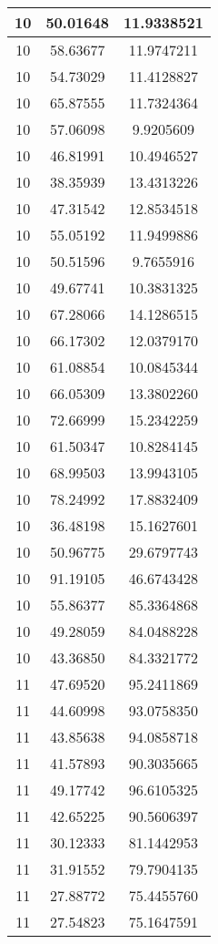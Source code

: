 \documentclass[
]{book}
\begin{document}
\begin{tabular}{c|c|c}
\hline
10 & 50.01648 & 11.9338521\\
\hline
10 & 58.63677 & 11.9747211\\
\hline
10 & 54.73029 & 11.4128827\\
\hline
10 & 65.87555 & 11.7324364\\
\hline
10 & 57.06098 & 9.9205609\\
\hline
10 & 46.81991 & 10.4946527\\
\hline
10 & 38.35939 & 13.4313226\\
\hline
10 & 47.31542 & 12.8534518\\
\hline
10 & 55.05192 & 11.9499886\\
\hline
10 & 50.51596 & 9.7655916\\
\hline
10 & 49.67741 & 10.3831325\\
\hline
10 & 67.28066 & 14.1286515\\
\hline
10 & 66.17302 & 12.0379170\\
\hline
10 & 61.08854 & 10.0845344\\
\hline
10 & 66.05309 & 13.3802260\\
\hline
10 & 72.66999 & 15.2342259\\
\hline
10 & 61.50347 & 10.8284145\\
\hline
10 & 68.99503 & 13.9943105\\
\hline
10 & 78.24992 & 17.8832409\\
\hline
10 & 36.48198 & 15.1627601\\
\hline
10 & 50.96775 & 29.6797743\\
\hline
10 & 91.19105 & 46.6743428\\
\hline
10 & 55.86377 & 85.3364868\\
\hline
10 & 49.28059 & 84.0488228\\
\hline
10 & 43.36850 & 84.3321772\\
\hline
11 & 47.69520 & 95.2411869\\
\hline
11 & 44.60998 & 93.0758350\\
\hline
11 & 43.85638 & 94.0858718\\
\hline
11 & 41.57893 & 90.3035665\\
\hline
11 & 49.17742 & 96.6105325\\
\hline
11 & 42.65225 & 90.5606397\\
\hline
11 & 30.12333 & 81.1442953\\
\hline
11 & 31.91552 & 79.7904135\\
\hline
11 & 27.88772 & 75.4455760\\
\hline
11 & 27.54823 & 75.1647591\\

\end{tabular}
\end{document}
